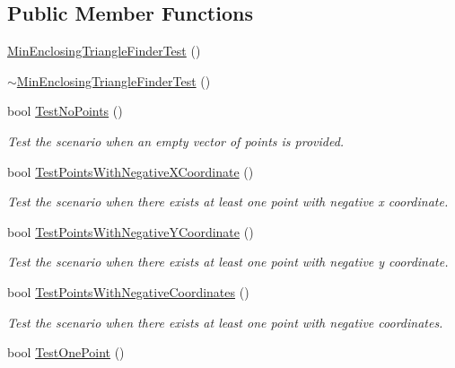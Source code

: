 \subsection*{\-Public \-Member \-Functions}
\begin{DoxyCompactItemize}
\item 
\hyperlink{classmultiscaletest_1_1MinEnclosingTriangleFinderTest_a3139504b01d664351450b36043f4d4cf}{\-Min\-Enclosing\-Triangle\-Finder\-Test} ()
\item 
\hyperlink{classmultiscaletest_1_1MinEnclosingTriangleFinderTest_a08084468ad154583a03421f73554342f}{$\sim$\-Min\-Enclosing\-Triangle\-Finder\-Test} ()
\item 
bool \hyperlink{classmultiscaletest_1_1MinEnclosingTriangleFinderTest_abf17e8fc35a7dfb9c958cd8f234eb84b}{\-Test\-No\-Points} ()
\begin{DoxyCompactList}\small\item\em \-Test the scenario when an empty vector of points is provided. \end{DoxyCompactList}\item 
bool \hyperlink{classmultiscaletest_1_1MinEnclosingTriangleFinderTest_aff1757d754844957ff8cdd5b216fc949}{\-Test\-Points\-With\-Negative\-X\-Coordinate} ()
\begin{DoxyCompactList}\small\item\em \-Test the scenario when there exists at least one point with negative x coordinate. \end{DoxyCompactList}\item 
bool \hyperlink{classmultiscaletest_1_1MinEnclosingTriangleFinderTest_aeaa607f08758082d6259bcd196de0d66}{\-Test\-Points\-With\-Negative\-Y\-Coordinate} ()
\begin{DoxyCompactList}\small\item\em \-Test the scenario when there exists at least one point with negative y coordinate. \end{DoxyCompactList}\item 
bool \hyperlink{classmultiscaletest_1_1MinEnclosingTriangleFinderTest_a083222fe0267efedd5ceb2e646ea821d}{\-Test\-Points\-With\-Negative\-Coordinates} ()
\begin{DoxyCompactList}\small\item\em \-Test the scenario when there exists at least one point with negative coordinates. \end{DoxyCompactList}\item 
bool \hyperlink{classmultiscaletest_1_1MinEnclosingTriangleFinderTest_ae493a4386e26014e765afa13575d63b9}{\-Test\-One\-Point} ()

\end{DoxyCompactItemize}
